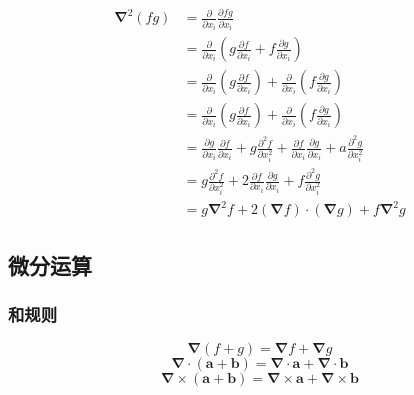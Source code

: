 \begin{align}
    \boldsymbol{\nabla}^2(fg)&=\frac{\partial}{\partial x_i}\frac{\partial fg}{\partial x_i}\nonumber\\
    &=\frac{\partial}{\partial x_i}\left(g\frac{\partial f}{\partial x_i}+f\frac{\partial g}{\partial x_i}\right)\nonumber\\
    &=\frac{\partial}{\partial x_i}\left(g\frac{\partial f}{\partial x_i}\right)+\frac{\partial}{\partial x_i}\left(f\frac{\partial g}{\partial x_i}\right)\nonumber\\
    &=\frac{\partial}{\partial x_i}\left(g\frac{\partial f}{\partial x_i}\right)
    +\frac{\partial}{\partial x_i}\left(f\frac{\partial g}{\partial x_i}\right)\nonumber\\
    &=\frac{\partial g}{\partial x_i}\frac{\partial f}{\partial x_i}
    +g\frac{\partial^2 f}{\partial x_i^2}
    +\frac{\partial f}{\partial x_i}\frac{\partial g}{\partial x_i}
    +a\frac{\partial^2 g}{\partial x_i^2}\nonumber\\
    &=g\frac{\partial^2 f}{\partial x_i^2}
    +2\frac{\partial f}{\partial x_i}\frac{\partial g}{\partial x_i}
    +f\frac{\partial^2 g}{\partial x_i^2}\nonumber\\
    &=g\boldsymbol{\nabla}^2f
    +2(\boldsymbol{\nabla}f)\cdot(\boldsymbol{\nabla}g)
    +f\boldsymbol{\nabla}^2g
\end{align}
\subsection{微分运算}
\subsubsection{和规则}
\begin{equation}
    \boldsymbol{\nabla}(f+g)=\boldsymbol{\nabla}f+\boldsymbol{\nabla}g
\end{equation}
\begin{equation}
    \boldsymbol{\nabla}\cdot(\boldsymbol{a}+\boldsymbol{b})=\boldsymbol{\nabla}\cdot\boldsymbol{a}+\boldsymbol{\nabla}\cdot\boldsymbol{b}
\end{equation}
\begin{equation}
    \boldsymbol{\nabla}\times(\boldsymbol{a}+\boldsymbol{b})=\boldsymbol{\nabla}\times\boldsymbol{a}+\boldsymbol{\nabla}\times\boldsymbol{b}
\end{equation}
